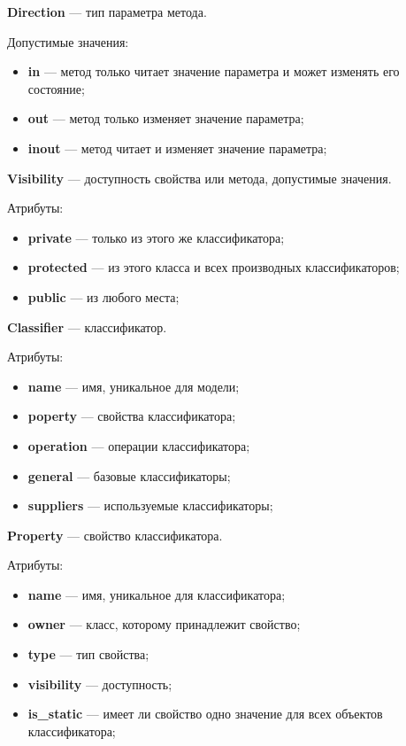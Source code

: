 \textbf{Direction} --- тип параметра метода.

Допустимые значения:
\begin{itemize}
\item \textbf{in} --- метод только читает значение параметра и может изменять его состояние;
\item \textbf{out} --- метод только изменяет значение параметра;
\item \textbf{inout} --- метод читает и изменяет значение параметра;
\end{itemize}

\textbf{Visibility} --- доступность свойства или метода, допустимые значения.

Атрибуты:
\begin{itemize}
\item \textbf{private} --- только из этого же классификатора;
\item \textbf{protected} --- из этого класса и всех производных классификаторов;
\item \textbf{public} --- из любого места;
\end{itemize}

\textbf{Classifier} --- классификатор.

Атрибуты:
\begin{itemize}
\item \textbf{name} --- имя, уникальное для модели;
\item \textbf{poperty} --- свойства классификатора;
\item \textbf{operation} --- операции классификатора;
\item \textbf{general} --- базовые классификаторы;
\item \textbf{suppliers} --- используемые классификаторы;
\end{itemize}

\textbf{Property} --- свойство классификатора.

Атрибуты:
\begin{itemize}
\item \textbf{name} --- имя, уникальное для классификатора;
\item \textbf{owner} --- класс, которому принадлежит свойство;
\item \textbf{type} --- тип свойства;
\item \textbf{visibility} --- доступность;
\item \textbf{is\_static} --- имеет ли свойство одно значение для всех объектов классификатора;
\end{itemize}

